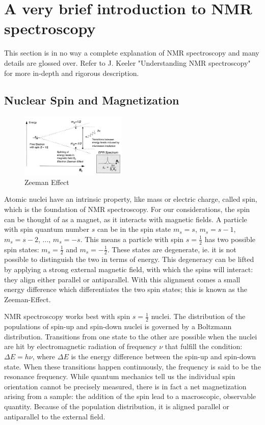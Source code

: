 \documentclass[12pt]{article}
\begin{document}
\section{A very brief introduction to NMR spectroscopy}

This section is in no way a complete explanation of NMR spectroscopy and many details are glossed over. Refer to J. Keeler "Understanding NMR spectroscopy" for more in-depth and rigorous description.

\subsection{Nuclear Spin and Magnetization}
\begin{figure}
    \centering
    \includegraphics[width=0.45\textwidth]{ZeemanEffect.png}
    \caption{Zeeman Effect}
\end{figure}
Atomic nuclei have an intrinsic property, like mass or electric charge, called spin, which is the foundation of NMR spectroscopy. For our considerations, the spin can be thought of as a magnet, as it interacts with magnetic fields. A particle with spin quantum number $s$ can be in the spin state $m_s = s$, $m_s = s-1$, $m_s = s-2$, ..., $m_s = -s$. This means a particle with spin $s=\frac{1}{2}$ has two possible spin states: $m_s = \frac{1}{2}$ and $m_s = -\frac{1}{2}$. These states are degenerate, ie. it is not possible to distinguish the two in terms of energy. This degeneracy can be lifted by applying a strong external magnetic field, with which the spins will interact: they align either parallel or antiparallel. With this alignment comes a small energy difference which differentiates the two spin states; this is known as the Zeeman-Effect. 

NMR spectroscopy works best with spin $s=\frac{1}{2}$ nuclei. The distribution of the populations of spin-up and spin-down nuclei is governed by a Boltzmann distribution. Transitions from one state to the other are possible when the nuclei are hit by electromagnetic radiation of frequency $\nu$ that fulfill the condition: $\Delta E = h \nu$, where $\Delta E$ is the energy difference between the spin-up and spin-down state. When these transitions happen continuously, the frequency is said to be the resonance frequency. While quantum mechanics tell us the individual spin orientation cannot be precisely measured, there is in fact a net magnetization arising from a sample: the addition of the spin lead to a macroscopic, observable quantity. Because of the population distribution, it is aligned parallel or antiparallel to the external field.
\end{document}
